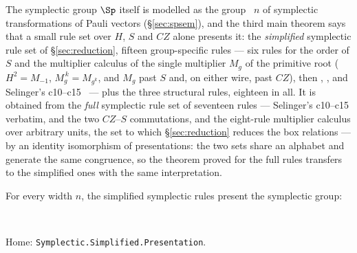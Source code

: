 The symplectic group $\Sp$ itself is modelled as the group
~$n$ of symplectic transformations of Pauli vectors
(\S\ref{sec:spsem}), and the third main theorem says that a small rule
set over $H$, $S$ and $CZ$ alone presents it: the \emph{simplified}
symplectic rule set of \S\ref{sec:reduction}, fifteen group-specific
rules --- six rules for the order of $S$ and the multiplier calculus of
the single multiplier $M_g$ of the primitive root ($H^{2} = M_{-1}$,
$M_g^{\,k} = M_{g^k}$, and $M_g$ past $S$ and, on either wire, past
$CZ$), then , ,  and
Selinger's c10--c15~\cite{selinger2015clifford} --- plus the three
structural rules, eighteen in all.  It is obtained from the \emph{full}
symplectic rule set of seventeen rules --- Selinger's c10--c15
verbatim,  and the two $CZ$--$S$ commutations, and the
eight-rule multiplier calculus over arbitrary units, the set to which
\S\ref{sec:reduction} reduces the box relations --- by an identity
isomorphism of presentations: the two sets share an
alphabet and generate the same congruence, so the theorem proved for
the full rules transfers to the simplified ones with the same
interpretation.

\begin{theorem}\label{thm:sp}
For every width $n$, the simplified symplectic rules present the
symplectic group:
\begin{code}%
\>[0]\AgdaSpace{}%
\AgdaSymbol{:}\AgdaSpace{}%
\AgdaSpace{}%
\AgdaSymbol{\{}\AgdaSymbol{\}}\AgdaSpace{}%
\AgdaSpace{}%
\AgdaSymbol{(}\AgdaSpace{}%
\AgdaSymbol{)}\AgdaSpace{}%
\AgdaSpace{}%
\AgdaSymbol{(}\AgdaSpace{}%
\AgdaSymbol{)}\<%
\\
\>[0]\AgdaSpace{}%
\AgdaSymbol{=}\AgdaSpace{}%
\<%
\end{code}
\noindent Home: \texttt{Symplectic.Simplified.Presentation}.
\end{theorem}

